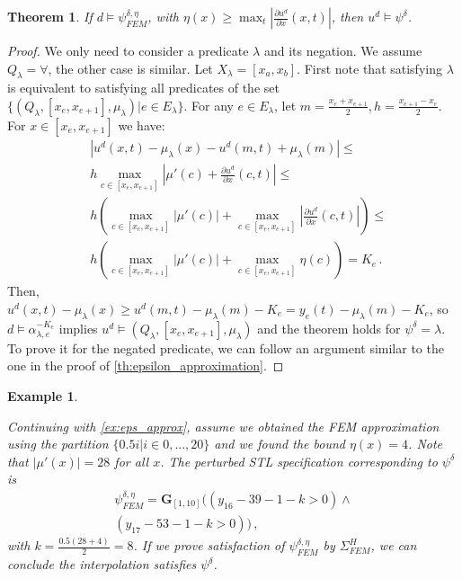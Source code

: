\documentclass[letterpaper, 10 pt, conference]{ieeeconf/ieeeconf}
\newtheorem{theorem}{Theorem}
\newtheorem{example}{Example}
\newcommand{\Always}{\mathbf{G}}
\begin{document}
\begin{theorem}
\label{th:eta_approximation}
    If $d \models \psi^{\delta, \eta}_{FEM}$, with $\eta(x) \geq \max_t |\frac{\partial
    u^d}{\partial x}(x, t)|$, then $u^d \models \psi^\delta$.
\end{theorem}
\begin{proof}
    We only need to consider a predicate $\lambda$ and its negation. We assume
    $Q_\lambda = \forall$, the other case is similar. Let $X_\lambda = [x_a,
    x_b]$. First note that satisfying $\lambda$ is equivalent to satisfying all
    predicates of the set $\{(Q_\lambda, [x_e, x_{e+1}], \mu_\lambda) | e \in
    E_\lambda\}$. For any $e \in E_\lambda$, let $m = \frac{x_e + x_{e+1}}{2}, 
    h = \frac{x_{e+1} - x_{e}}{2}$. 
    For $x \in [x_e, x_{e+1}]$ we have:
    \begin{equation}
    \begin{aligned}
        &|u^d(x, t) - \mu_\lambda(x) - u^d(m, t) + \mu_\lambda(m)| \leq \\
        &h \max_{c \in [x_e, x_{e+1}]} 
        |\mu'(c) + \frac{\partial u^d}{\partial x}(c, t)| \leq \\
        &h \left (  
        \max_{c \in [x_e, x_{e+1}]} |\mu'(c)| +
        \max_{c \in [x_e, x_{e+1}]} |\frac{\partial u^d}{\partial x}(c, t)|
        \right ) \leq \\
        &h \left (  
        \max_{c \in [x_e, x_{e+1}]} |\mu'(c)| +
        \max_{c \in [x_e, x_{e+1}]} \eta(c)
        \right )  = K_e \,.
    \end{aligned}
    \end{equation}
    Then, $u^d(x, t) - \mu_\lambda(x) \geq u^d(m, t) - \mu_\lambda(m) - K_e =
    y_e(t) - \mu_\lambda(m) - K_e$, so $d \models \alpha^{-K_e}_{\lambda, e}$
    implies $u^d \models (Q_\lambda, [x_e, x_{e+1}], \mu_\lambda)$ and the
    theorem holds for $\psi^\delta = \lambda$. To prove it for the negated
    predicate, we can follow an argument similar to the one in the proof of
    \cref{th:epsilon_approximation}.
\end{proof}

\begin{example}
    \label{ex:eta_approx}

    Continuing with \cref{ex:eps_approx}, assume we obtained the FEM
    approximation using the partition $\{0.5 i | i \in 0,...,20\}$ and we found the
    bound $\eta(x) = 4$. Note that $|\mu'(x)| = 28$ for all $x$. The perturbed STL
    specification corresponding to $\psi^\delta$ is
    \begin{multline}
        \psi^{\delta, \eta}_{FEM} = \Always_{[1,10]} \bigl(
            (y_{16} - 39 - 1 - k > 0) \land \\ (y_{17} - 53 - 1 - k > 0)
        \bigr) \,,
    \end{multline}
    with $k = \frac{0.5 (28 + 4)}{2} = 8$. If we prove satisfaction of $\psi^{\delta,
    \eta}_{FEM}$ by $\Sigma^H_{FEM}$, we can conclude the interpolation satisfies
    $\psi^\delta$.
    
\end{example}
\end{document}
